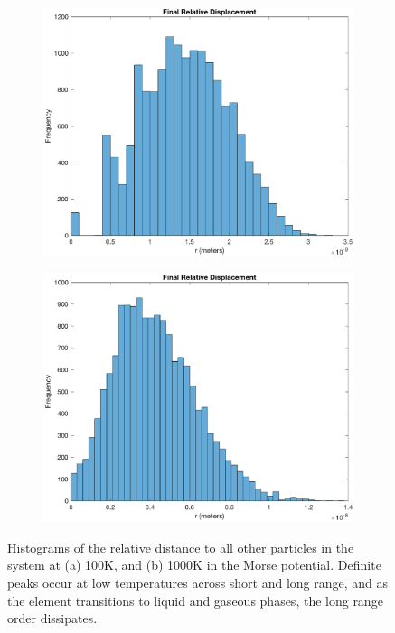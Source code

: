 \documentclass[12pt]{article}
\begin{document}
\begin{figure}[!h]
\begin{subfigure}{0.5\textwidth}
\includegraphics[width=0.9\linewidth]{./finalpics/Mfinalrelativer.eps}
\caption{\label{Mrel}}
\end{subfigure}
\begin{subfigure}{0.5\textwidth}
\includegraphics[width=0.9\linewidth]{./finalpics/Mrel1000.eps}
\caption{\label{Mrelhigh}}
\end{subfigure}
\caption{Histograms of the relative distance to all other particles in the system at (a) 100K, and (b) 1000K in the Morse potential.  Definite peaks occur at low temperatures across short and long range, and as the element transitions to liquid and gaseous phases, the long range order dissipates.}
\end{figure}
\end{document}
